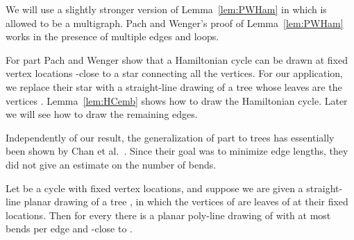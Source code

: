 \documentclass{llncs}
\begin{document}
We will use a slightly stronger version of Lemma~\ref{lem:PWHam} in which  is allowed to be a multigraph. Pach and Wenger's proof of Lemma~\ref{lem:PWHam} works in the presence of multiple edges and loops.

For part  Pach and Wenger show that a Hamiltonian cycle can be drawn at fixed vertex locations -close to a star connecting all the vertices. For our application, we replace their star with a straight-line drawing of a tree  whose leaves are the vertices . Lemma~\ref{lem:HCemb} shows how to draw the Hamiltonian cycle. Later we will see how to draw the remaining edges.

Independently of our result, the generalization of part  to trees has essentially been shown by Chan et al.~\cite{CHKL13}. Since their goal was to minimize edge lengths, they did not give an estimate on the number of bends.

\begin{lemma}
\label{lem:HCemb}
 Let  be a cycle with fixed vertex locations, and suppose we are given a straight-line planar drawing of a tree , in which the vertices of  are leaves of  at their fixed locations. Then for every  there is a planar poly-line drawing of  with at most  bends per edge and -close to .
\end{lemma}
\end{document}
